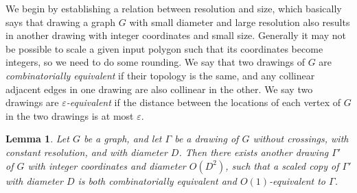\documentclass[11pt]{article}
\newtheorem {lemma} {Lemma}
\begin{document}
    We begin by establishing a relation between resolution and size, which basically says that drawing a graph $G$ with small diameter and large resolution also results in another drawing with integer coordinates and small size.
    Generally it may not be possible to scale a given input polygon such that its coordinates become integers, so we need to do some rounding. We say that two drawings of $G$ are \emph {combinatorially equivalent} if their topology is the same, and any collinear adjacent edges in one drawing are also collinear in the other.    
    We say two drawings are \emph {$\varepsilon$-equivalent} if the distance between the locations of each vertex of $G$ in the two drawings is at most $\varepsilon$.

    \begin {lemma} \label {lem:ressize}
      Let $G$ be a graph, and let $\Gamma$ be a drawing of $G$ without crossings, with constant resolution, and with diameter $D$. 
      Then there exists another drawing $\Gamma'$ of $G$ with integer coordinates and diameter $O(D^2)$, such that a scaled copy of $\Gamma'$ with diameter $D$ is both combinatorially equivalent and $O(1)$-equivalent to $\Gamma$.
    \end {lemma}
\end{document}

